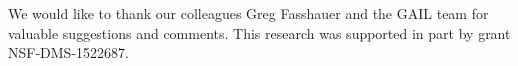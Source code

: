 \documentclass[review]{elsarticle}
\theoremstyle{definition}
\begin{document}
We would like to thank our colleagues Greg Fasshauer and the GAIL team
for valuable suggestions and comments. This research was supported in part by
grant NSF-DMS-1522687.





\end{document}

